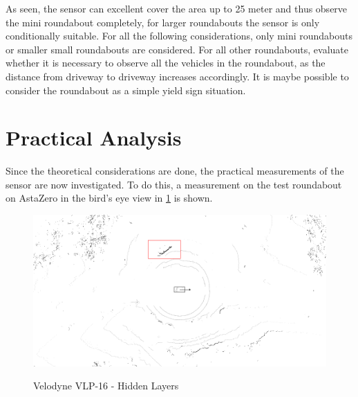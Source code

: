 \documentclass[11pt,oneside,openright]{mpreport}
\begin{document}

As seen, the sensor can excellent cover the area up to 25 meter and thus observe the mini roundabout completely, for larger roundabouts the sensor is only conditionally suitable. 
For all the following considerations, only mini roundabouts or smaller small roundabouts are considered. 
For all other roundabouts, evaluate whether it is necessary to observe all the vehicles in the roundabout, as the distance from driveway to driveway increases accordingly.
It is maybe possible to consider the roundabout as a simple yield sign situation.

\section{Practical Analysis}

Since the theoretical considerations are done, the practical measurements of the sensor are now investigated.
To do this, a measurement on the test roundabout on AstaZero in the bird's eye view in \cref{velodyne_hidden} is shown.

\begin{figure}[!ht]
\caption{Velodyne VLP-16 - Hidden Layers}
\includegraphics[width=\textwidth]{bilder/velodyne_back.png}
\label{velodyne_hidden}
\end{figure}
\end{document}
